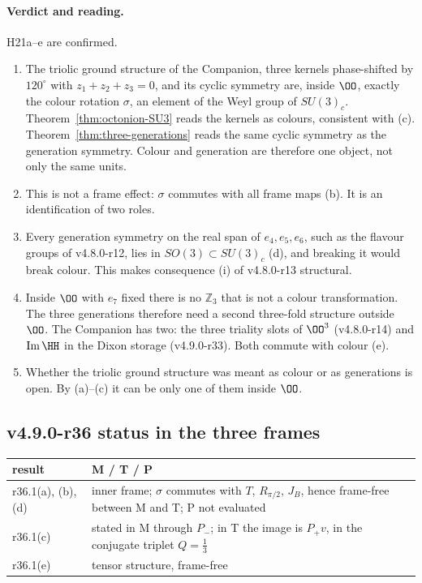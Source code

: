 \paragraph{Verdict and reading.}
H21a--e are confirmed.
\begin{enumerate}[leftmargin=2em]
\item The triolic ground structure of the Companion, three kernels phase-shifted by \(120^\circ\) with \(z_1+z_2+z_3=0\), and its
cyclic symmetry are, inside \(\OO\), exactly the colour rotation \(\sigma\), an element of the Weyl group of \(SU(3)_c\).
Theorem~\ref{thm:octonion-SU3} reads the kernels as colours, consistent with (c).  Theorem~\ref{thm:three-generations} reads the same
cyclic symmetry as the generation symmetry.  Colour and generation are therefore one object, not only the same units.
\item This is not a frame effect: \(\sigma\) commutes with all frame maps (b).  It is an identification of two roles.
\item Every generation symmetry on the real span of \(e_4,e_5,e_6\), such as the flavour groups of v4.8.0-r12, lies in
\(SO(3)\subset SU(3)_c\) (d), and breaking it would break colour.  This makes consequence (i) of v4.8.0-r13 structural.
\item Inside \(\OO\) with \(e_7\) fixed there is no \(\mathbb Z_3\) that is not a colour transformation.  The three generations
therefore need a second three-fold structure outside \(\OO\).  The Companion has two: the three triality slots of \(\OO^3\)
(v4.8.0-r14) and \(\operatorname{Im}\HH\) in the Dixon storage (v4.9.0-r33).  Both commute with colour (e).
\item Whether the triolic ground structure was meant as colour or as generations is open.  By (a)--(c) it can be only one of them
inside \(\OO\).
\end{enumerate}

\subsection*{v4.9.0-r36 status in the three frames}
\label{subsec:v490-r36-frames}

\begin{center}
\small
\begin{tabular}{@{}>{\raggedright\arraybackslash}p{}>{\raggedright\arraybackslash}p{}@{}}
\toprule
result & M / T / P\\
\midrule
r36.1(a), (b), (d) & inner frame; \(\sigma\) commutes with \(T\), \(R_{\pi/2}\), \(J_B\), hence frame-free between M and T; P not evaluated\\
r36.1(c) & stated in M through \(P_-\); in T the image is \(P_+v\), in the conjugate triplet \(Q=\tfrac13\)\\
r36.1(e) & tensor structure, frame-free\\
\bottomrule
\end{tabular}
\end{center}

